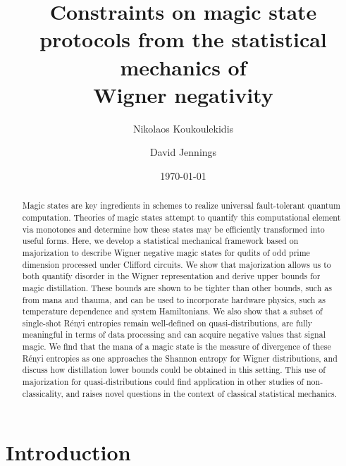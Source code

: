 \documentclass[pra,
aps,
twocolumn,
superscriptaddress,
groupedaddress,
nofootinbib,
reprint
]{revtex4-1}
\begin{document}
\begin{abstract}
Magic states are key ingredients in schemes to realize universal fault-tolerant quantum computation.
Theories of magic states attempt to quantify this computational element via monotones and determine how these states may be efficiently transformed into useful forms. Here, we develop a statistical mechanical framework based on majorization to describe Wigner negative magic states for qudits of odd prime dimension processed under Clifford circuits. We show that majorization allows us to both quantify disorder in the Wigner representation and derive upper bounds for magic distillation. These bounds are shown to be tighter than other bounds, such as from mana and thauma, and can be used to incorporate hardware physics, such as temperature dependence and system Hamiltonians. We also show that a subset of single-shot R\'{e}nyi entropies remain well-defined on quasi-distributions, are fully meaningful in terms of data processing and can acquire negative values that signal magic. We find that the mana of a magic state is the measure of divergence of these R\'{e}nyi entropies as one approaches the Shannon entropy for Wigner distributions, and discuss how distillation lower bounds could be obtained in this setting. This use of majorization for quasi-distributions could find application in other studies of non-classicality, and raises novel questions in the context of classical statistical mechanics.
\end{abstract}


\title{Constraints on magic state protocols from the statistical mechanics of \\Wigner negativity}

\author{Nikolaos Koukoulekidis}
\author{David Jennings}

\date{\today}
\maketitle


\section{Introduction}
\label{sec:intro}
\end{document}
